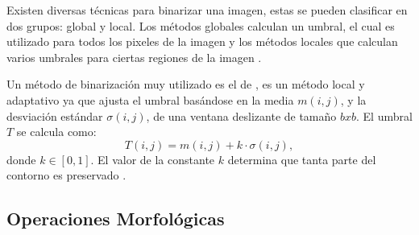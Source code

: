 Existen diversas técnicas para binarizar una imagen, estas se pueden clasificar en dos grupos: global y local. Los métodos globales calculan un umbral, el cual es utilizado para todos los pixeles de la imagen y los métodos locales que calculan varios umbrales para ciertas regiones de la imagen \citep{Chaki2014}.  

Un método de binarización muy utilizado es el de \citep{Niblack1985}, es un método local y adaptativo ya que ajusta el umbral basándose en la media $m(i,j)$, y la desviación estándar $\sigma(i,j)$, de una ventana deslizante de tamaño $bxb$. El umbral $T$ se calcula como: 
$$T(i,j)=m(i,j)+k \cdot \sigma(i,j),$$ 
donde $k \in [0,1]$. El valor de la constante $k$ determina que tanta parte del contorno es preservado \citep{Chaki2014}.


\subsection{Operaciones Morfológicas}\label{subsec:OperacionesMorfologicas} 

